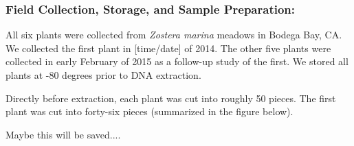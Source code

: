 
\subsubsection{Field Collection, Storage, and Sample Preparation:}

All six plants were collected from \textit{Zostera marina} meadows in Bodega Bay, CA. We collected the first plant in [time/date] of 2014. The other five plants were collected in early February of 2015 as a follow-up study of the first. We stored all plants at -80 degrees prior to DNA extraction. 

Directly before extraction, each plant was cut into roughly 50 pieces. The first plant was cut into forty-six pieces (summarized in the figure below). 

Maybe this will be saved....